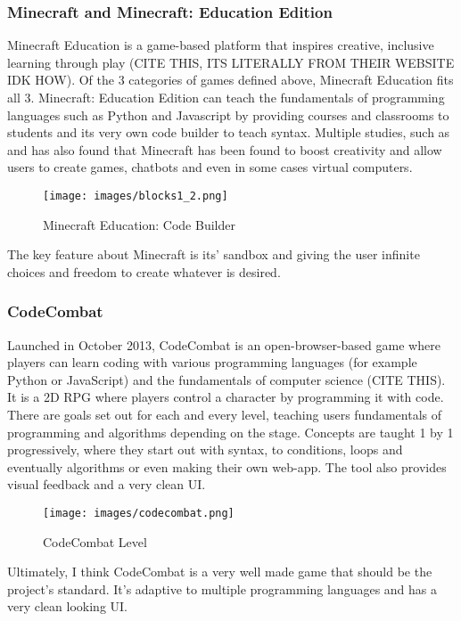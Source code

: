 \subsubsection{Minecraft and Minecraft: Education Edition}
Minecraft Education is a game-based platform that inspires creative, inclusive learning through play (CITE THIS, ITS LITERALLY FROM THEIR WEBSITE IDK HOW). Of the 3 categories of games defined above, Minecraft Education fits all 3. Minecraft: Education Edition can teach the fundamentals of programming languages such as Python and Javascript by providing courses and classrooms to students and its very own code builder to teach syntax. Multiple studies, such as \cite{kuhn2018minecraft} and \cite{9803384} has also found that Minecraft has been found to boost creativity and allow users to create games, chatbots and even in some cases virtual computers.
\begin{figure}[H]
    \centering
    \texttt{[image: images/blocks1\_2.png]}
    \caption{Minecraft Education: Code Builder}
    \label{fig:minecraft_code_builder}
\end{figure}

The key feature about Minecraft is its' sandbox and giving the user infinite choices and freedom to create whatever is desired.

\subsubsection{CodeCombat}
Launched in October 2013, CodeCombat is an open-browser-based game where players can learn coding with various programming languages (for example Python or JavaScript) and the fundamentals of computer science (CITE THIS). It is a 2D RPG where players control a character by programming it with code. There are goals set out for each and every level, teaching users fundamentals of programming and algorithms depending on the stage. Concepts are taught 1 by 1 progressively, where they start out with syntax, to conditions, loops and eventually algorithms or even making their own web-app. The tool also provides visual feedback and a very clean UI.

\begin{figure}[H]
    \centering
    \texttt{[image: images/codecombat.png]}
    \caption{CodeCombat Level}
\end{figure}
Ultimately, I think CodeCombat is a very well made game that should be the project's standard. It's adaptive to multiple programming languages and has a very clean looking UI.


